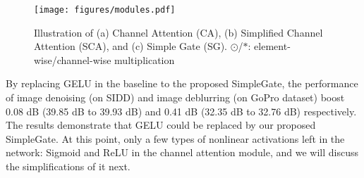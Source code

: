 \documentclass[runningheads]{llncs}
\begin{document}
\begin{figure*}[!t]
\texttt{[image: figures/modules.pdf]}
\caption{ Illustration of (a) Channel Attention\cite{hu2018squeeze} (CA), (b) Simplified Channel Attention (SCA), and (c) Simple Gate (SG). $\odot$/$*$: element-wise/channel-wise multiplication
}
\label{fig:OurModules}
\end{figure*}

By replacing GELU in the baseline to the proposed SimpleGate, the performance of image denoising (on SIDD\cite{SIDD_2018_CVPR}) and image deblurring (on GoPro\cite{nah2017deep} dataset) boost 0.08 dB (39.85 dB to 39.93 dB) and 0.41 dB (32.35 dB to 32.76 dB) respectively. The results demonstrate that GELU could be replaced by our proposed SimpleGate. At this point, only a few types of nonlinear activations left in the network: Sigmoid and ReLU in the channel attention module\cite{hu2018squeeze}, and we will discuss the simplifications of it next.
\end{document}
